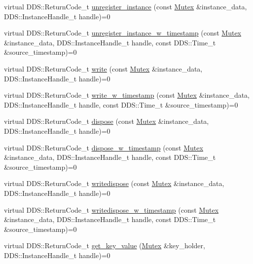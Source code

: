 \begin{DoxyCompactItemize}
\item 
virtual DDS::ReturnCode\_\-t \hyperlink{classKnowledge_1_1MutexDataWriter_aadc1341612204f33260daba708c02fee}{unregister\_\-instance} (const \hyperlink{structKnowledge_1_1Mutex}{Mutex} \&instance\_\-data, DDS::InstanceHandle\_\-t handle)=0
\item 
virtual DDS::ReturnCode\_\-t \hyperlink{classKnowledge_1_1MutexDataWriter_ab2838f1a4d051050fb3348d3169a6359}{unregister\_\-instance\_\-w\_\-timestamp} (const \hyperlink{structKnowledge_1_1Mutex}{Mutex} \&instance\_\-data, DDS::InstanceHandle\_\-t handle, const DDS::Time\_\-t \&source\_\-timestamp)=0
\item 
virtual DDS::ReturnCode\_\-t \hyperlink{classKnowledge_1_1MutexDataWriter_a6d2ed8805efb759b25f5981530c4a47a}{write} (const \hyperlink{structKnowledge_1_1Mutex}{Mutex} \&instance\_\-data, DDS::InstanceHandle\_\-t handle)=0
\item 
virtual DDS::ReturnCode\_\-t \hyperlink{classKnowledge_1_1MutexDataWriter_a2b9c4dd693451bd6319fae4fbbc17a70}{write\_\-w\_\-timestamp} (const \hyperlink{structKnowledge_1_1Mutex}{Mutex} \&instance\_\-data, DDS::InstanceHandle\_\-t handle, const DDS::Time\_\-t \&source\_\-timestamp)=0
\item 
virtual DDS::ReturnCode\_\-t \hyperlink{classKnowledge_1_1MutexDataWriter_a4d7b7ee099119775d9b6ff120265d9be}{dispose} (const \hyperlink{structKnowledge_1_1Mutex}{Mutex} \&instance\_\-data, DDS::InstanceHandle\_\-t handle)=0
\item 
virtual DDS::ReturnCode\_\-t \hyperlink{classKnowledge_1_1MutexDataWriter_a6b2ae2619ed3c9acb478bc1cb16ac3fd}{dispose\_\-w\_\-timestamp} (const \hyperlink{structKnowledge_1_1Mutex}{Mutex} \&instance\_\-data, DDS::InstanceHandle\_\-t handle, const DDS::Time\_\-t \&source\_\-timestamp)=0
\item 
virtual DDS::ReturnCode\_\-t \hyperlink{classKnowledge_1_1MutexDataWriter_a65cac8d7d8f8cf24410247cd16b96cc4}{writedispose} (const \hyperlink{structKnowledge_1_1Mutex}{Mutex} \&instance\_\-data, DDS::InstanceHandle\_\-t handle)=0
\item 
virtual DDS::ReturnCode\_\-t \hyperlink{classKnowledge_1_1MutexDataWriter_a42e1a1f013d1e6617774bd4d3da9a2dd}{writedispose\_\-w\_\-timestamp} (const \hyperlink{structKnowledge_1_1Mutex}{Mutex} \&instance\_\-data, DDS::InstanceHandle\_\-t handle, const DDS::Time\_\-t \&source\_\-timestamp)=0
\item 
virtual DDS::ReturnCode\_\-t \hyperlink{classKnowledge_1_1MutexDataWriter_a304c30d3e7e62d434aa2fea910a35d0a}{get\_\-key\_\-value} (\hyperlink{structKnowledge_1_1Mutex}{Mutex} \&key\_\-holder, DDS::InstanceHandle\_\-t handle)=0
\end{DoxyCompactItemize}
